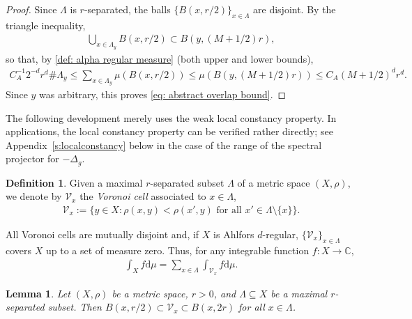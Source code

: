 \documentclass[12pt,reqno]{amsart}
\newtheorem{lemma}[theorem]{Lemma}
\theoremstyle{definition}
\newtheorem{definition}[theorem]{Definition}
\theoremstyle{remark}
\numberwithin{equation}{section}
\newcommand{\1}{\mathbbm{1}}
\newcommand{\C}{\mathbb{C}}
\def\rd{\mathrm{d}}
\begin{document}
\begin{proof}
  Since $\Lambda$ is $r$-separated, the balls $\{B(x,r/2)\}_{x\in\Lambda}$ are disjoint. By the triangle inequality,
  \begin{align*}
    \bigcup_{x\in\Lambda_y}B(x,r/2)\subset B(y,(M+1/2)r),
  \end{align*}
  so that, by \eqref{def: alpha regular measure} (both upper and lower bounds), 
  \begin{align*}
    C_A^{-1}2^{-d}r^d\#\Lambda_y
    \leq \sum_{x\in\Lambda_y}\mu(B(x,r/2))
    \leq \mu(B(y,(M+1/2)r))
    \leq C_A(M+1/2)^dr^d.
  \end{align*}
  Since $y$ was arbitrary, this proves \eqref{eq: abstract overlap bound}. 
\end{proof}

The following development merely uses the weak local constancy property. In applications, the local constancy property can be verified rather directly; see Appendix~\ref{s:localconstancy} below in the case of the range of the spectral projector for $-\Delta_g$.

\begin{definition}
  Given a maximal $r$-separated subset $\Lambda$ of a metric space $(X,\rho)$, we denote by $\mathcal{V}_x$ the {\em Voronoi cell} associated to $x\in\Lambda$,
  \begin{align}
    \mathcal{V}_x := \{y\in X:\rho(x,y)<\rho(x',y)\mbox{ for all }x'\in\Lambda\setminus\{x\}\}.
  \end{align}
\end{definition}

All Voronoi cells are mutually disjoint and, if $X$ is  Ahlfors $d$-regular, $\{\mathcal{V}_x\}_{x\in\Lambda}$ covers $X$ up to a set of measure zero. Thus, for any integrable function $f:X\to \C$,
\begin{align*}
  \int_X f\rd\mu=\sum_{x\in\Lambda}\int_{\mathcal{V}_x}f\rd\mu.
\end{align*}

\begin{lemma}\label{lemma: radius Voronoi}
  Let $(X,\rho)$ be a metric space, $r>0$, and $\Lambda\subseteq X$ be a maximal $r$-separated subset. Then $B(x,r/2)\subset \mathcal{V}_x\subset B(x,2r)$ for all $x\in\Lambda$.
\end{lemma}
\end{document}
